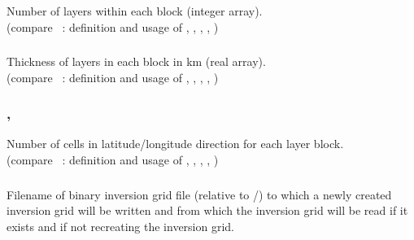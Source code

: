 \subsubsection{}
Number of layers within each block (integer array).\\
(compare ~: definition and usage of , 
, , , )
\subsubsection{}
Thickness of layers in each block in km (real array).\\
(compare ~: definition and usage of , 
, , , )
\subsubsection{, }
Number of cells in latitude/longitude direction for each layer block.\\
(compare ~: definition and usage of , 
, , , )
\subsubsection{}
Filename of binary inversion grid file (relative to /)
to which a newly created inversion grid will be written and from which the inversion grid
will be read if it exists and if not recreating the inversion grid.
